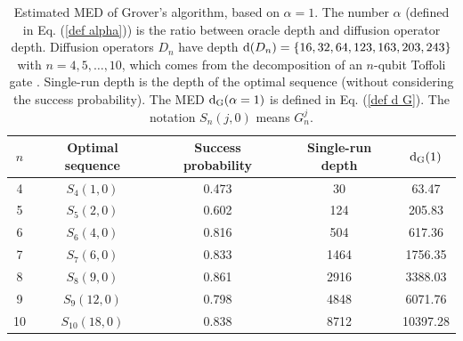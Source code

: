 \documentclass[%
 twocolumn,
 10pt,
 superscriptaddress,
 longbibliography,
 amsmath,amssymb,
 aps,
 pra,
floatfix,
]{revtex4-1}
\begin{document}
\begin{table}[h]
	\begin{ruledtabular}
		\caption{\label{Table 1}  Estimated MED of Grover's algorithm, based on $\alpha=1$. The number $\alpha$ (defined in Eq. (\ref{def alpha})) is the ratio between oracle depth and diffusion operator depth. Diffusion operators $D_n$ have depth $\text d(D_n)=\{16,32,64,123,163,203,243\}$ with $n=4,5,\ldots,10$, which comes from the decomposition of an $n$-qubit Toffoli gate \cite{BBCDMSSSW95}. Single-run depth is the depth of the optimal sequence (without considering the success probability). The MED $\text d_\text{G}(\alpha=1)$ is defined in Eq. (\ref{def d G}). The notation $S_n(j,0)$ means $G^j_n$.}


		\begin{tabular}{ccccc}

			$n$ & Optimal sequence & Success probability & Single-run depth & $\text d_\text{G}(1)$ \\ \hline

			4   & $S_4(1,0)$       & 0.473               & 30               & 63.47                 \\

			5   & $S_5(2,0)$       & 0.602               & 124              & 205.83                \\

			6   & $S_6(4,0)$       & 0.816               & 504              & 617.36                \\

			7   & $S_7(6,0)$       & 0.833               & 1464             & 1756.35               \\

			8   & $S_8(9,0)$       & 0.861               & 2916             & 3388.03               \\

			9   & $S_9(12,0)$      & 0.798               & 4848             & 6071.76               \\

			10  & $S_{10}(18,0)$   & 0.838               & 8712             & 10397.28              \\
		\end{tabular}
	\end{ruledtabular}

\end{table}
\end{document}
